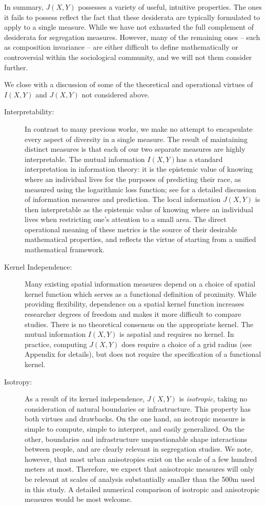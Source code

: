 	In summary, $J(X,Y)$ possesses a variety of useful, intuitive properties. The ones it fails to possess reflect the fact that these desiderata are typically formulated to apply to a single measure. While we have not exhausted the full complement of desiderata for segregation measures. However, many of the remaining ones -- such as composition invariance -- are either difficult to define mathematically or controversial within the sociological community, and we will not them consider further. 

	We close with a discussion of some of the theoretical and operational virtues of $I(X,Y)$ and $J(X,Y)$ not considered above. 
	\begin{description}
		\item[Interpretability:] In contrast to many previous works, we make no attempt to encapsulate every aspect of diversity in a single measure. The result of maintaining distinct measures is that each of our two separate measures are highly interpretable. The mutual information $I(X,Y)$has a standard interpretation in information theory: it is the epistemic value of knowing where an individual lives for the purposes of predicting their race, as measured using the logarithmic loss function; see \cite{Cover1991} for a detailed discussion of information measures and prediction. The local information $J(X,Y)$ is then interpretable as the epistemic value of knowing where an individual lives when restricting one's attention to a small area. The direct operational meaning of these metrics is the source of their desirable mathematical properties, and reflects the virtue of starting from a unified mathematical framework.  
		\item[Kernel Independence:] Many existing spatial information measures depend on a choice of spatial kernel function which serves as a functional definition of proximity. While providing flexibility, dependence on a spatial kernel function increases researcher degrees of freedom and makes it more difficult to compare studies. There is no theoretical consensus on the appropriate kernel. The mutual information $I(X,Y)$ is aspatial and requires no kernel. In practice, computing $J(X,Y)$ does require a choice of a grid radius (see Appendix for details), but does not require the specification of a functional kernel. 
		\item[Isotropy:] As a result of its kernel independence, $J(X,Y)$ is \emph{isotropic}, taking no consideration of natural boundaries or infrastructure. This property has both virtues and drawbacks. On the one hand, an isotropic measure is simple to compute, simple to interpret, and easily generalized. On the other, boundaries and infrastructure unquestionable shape interactions between people, and are clearly relevant in segregation studies. We note, however, that most urban anisotropies exist on the scale of a few hundred meters at most. Therefore, we expect that anisotropic measures will only be relevant at scales of analysis substantially smaller than the 500m used in this study. A detailed numerical comparison of isotropic and anisotropic measures would be most welcome. 

\end{description}
